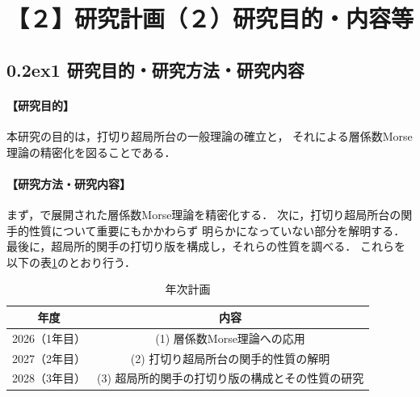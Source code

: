 \documentclass[11pt,a4paper,uplatex,dvipdfmx]{ujarticle} 		%
\newcommand{\研究課題名}{打切り超局所台の関手的性質の研究とMorse理論への応用}
\newcommand{\研究機関名}{北海道大学}
\newcommand{\研究代表者氏名}{大柴寿浩}
\newcommand{\ctext}[1]{\raise0.2ex\hbox{\textcircled{\scriptsize{#1}}}}
\begin{document}



\section{【２】研究計画（２）研究目的・内容等}
\vspace{-30pt}
\subsection*{\ctext{1} 研究目的・研究方法・研究内容}
\paragraph{【研究目的】}
本研究の目的は，打切り超局所台の一般理論の確立と，
それによる層係数Morse理論の精密化を図ることである．
\vspace{-10pt}
\paragraph{【研究方法・研究内容】}
まず，\cite{ST92}で展開された層係数Morse理論を精密化する．
次に，打切り超局所台の関手的性質について重要にもかかわらず
明らかになっていない部分を解明する．
最後に，超局所的関手の打切り版を構成し，それらの性質を調べる．
これらを以下の表\ref{tab1}のとおり行う．


\begin{table}[h]
	\vspace{-11pt}
\begin{center}
	\caption{年次計画}
	\label{tab1}
	\begin{tabular}{cc}\toprule
		年度 & 内容 \\\midrule
		2026（1年目）& (1) 層係数Morse理論への応用 \\
		2027（2年目）& (2) 打切り超局所台の関手的性質の解明\\
		2028（3年目）& (3) 超局所的関手の打切り版の構成とその性質の研究\\\bottomrule
	\end{tabular}
\end{center}
\vspace{-44pt}
\end{table}
\end{document}
